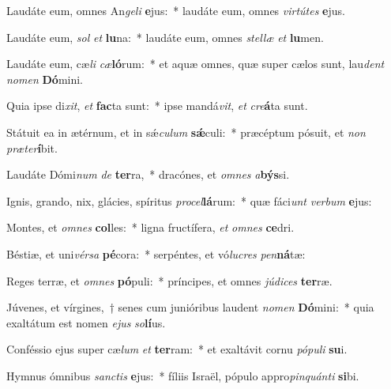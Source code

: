 \item Laudáte eum, omnes An\textit{ge}\textit{li} \textbf{e}jus:~* laudáte eum, omnes \textit{vir}\textit{tú}\textit{tes} \textbf{e}jus.
\item Laudáte eum, \textit{sol} \textit{et} \textbf{lu}na:~* laudáte eum, omnes \textit{stel}\textit{læ} \textit{et} \textbf{lu}men.
\item Laudáte eum, cæ\textit{li} \textit{cæ}\textbf{ló}rum:~* et aquæ omnes, quæ super cælos sunt, lau\textit{dent} \textit{no}\textit{men} \textbf{Dó}mini.
\item Quia ipse di\textit{xit}, \textit{et} \textbf{fac}ta sunt:~* ipse mandá\textit{vit}, \textit{et} \textit{cre}\textbf{á}ta sunt.
\item Státuit ea in ætérnum, et in sǽ\textit{cu}\textit{lum} \textbf{sǽ}culi:~* præcéptum pósuit, et \textit{non} \textit{præ}\textit{ter}\textbf{í}bit.
\item Laudáte Dómi\textit{num} \textit{de} \textbf{ter}ra,~* dracónes, et \textit{om}\textit{nes} \textit{a}\textbf{býs}si.
\item Ignis, grando, nix, glácies, spíritus \textit{pro}\textit{cel}\textbf{lá}rum:~* quæ fáci\textit{unt} \textit{ver}\textit{bum} \textbf{e}jus:
\item Montes, et \textit{om}\textit{nes} \textbf{col}les:~* ligna fructífera, \textit{et} \textit{om}\textit{nes} \textbf{ce}dri.
\item Béstiæ, et uni\textit{vér}\textit{sa} \textbf{pé}cora:~* serpéntes, et vó\textit{lu}\textit{cres} \textit{pen}\textbf{ná}tæ:
\item Reges terræ, et \textit{om}\textit{nes} \textbf{pó}puli:~* príncipes, et omnes \textit{jú}\textit{di}\textit{ces} \textbf{ter}ræ.
\item Júvenes, et vírgines,~† senes cum junióribus laudent \textit{no}\textit{men} \textbf{Dó}mini:~* quia exaltátum est nomen \textit{e}\textit{jus} \textit{so}\textbf{lí}us.
\item Conféssio ejus super cæ\textit{lum} \textit{et} \textbf{ter}ram:~* et exaltávit cornu \textit{pó}\textit{pu}\textit{li} \textbf{su}i.
\item Hymnus ómnibus \textit{sanc}\textit{tis} \textbf{e}jus:~* fíliis Israël, pópulo appro\textit{pin}\textit{quán}\textit{ti} \textbf{si}bi.
